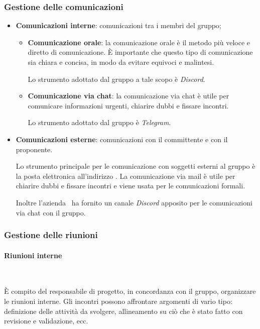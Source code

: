         \subsubsection{Gestione delle comunicazioni}
            \begin{itemize}
                \item \textbf{Comunicazioni interne}: comunicazioni tra i membri del gruppo;
                \begin{itemize}
                    \item \textbf{Comunicazione orale}: la comunicazione orale è il metodo più veloce e diretto di comunicazione. È importante che questo tipo di comunicazione sia chiara e concisa, in modo da evitare equivoci e malintesi.

                    Lo strumento adottato dal gruppo a tale scopo è \textit{Discord}.
                    \item \textbf{Comunicazione via chat}: la comunicazione via chat è utile per comunicare informazioni urgenti, chiarire dubbi e fissare incontri.

                    Lo strumento adottato dal gruppo è \textit{Telegram}.
                \end{itemize}
                \item \textbf{Comunicazioni esterne}: comunicazioni con il committente e con il proponente.

                Lo strumento principale per le comunicazione con soggetti esterni al gruppo è la posta elettronica all'indirizzo \groupMail. La comunicazione via mail è utile per chiarire dubbi e fissare incontri e viene usata per le comunicazioni formali.

                Inoltre l'azienda \companyName\ ha fornito un canale \textit{Discord} apposito per le comunicazioni via chat con il gruppo.
            \end{itemize}

        \subsubsection{Gestione delle riunioni}
        \paragraph{Riunioni interne}~

        \noindent È compito del responsabile di progetto, in concordanza con il gruppo, organizzare le riunioni interne. Gli incontri possono affrontare argomenti di vario tipo: definizione delle attività da svolgere, allineamento su ciò che è stato fatto con revisione e validazione, ecc.

